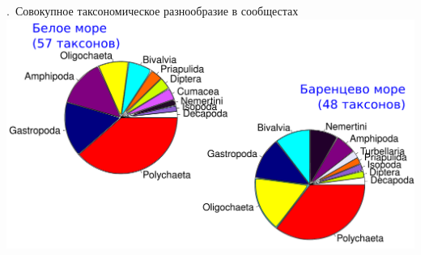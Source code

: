 \documentclass[aspectratio=169, xcolor=table]{beamer}
\begin{document}
\begin{frame}{\insertpagenumber.\ Совокупное таксономическое разнообразие в сообщестах}
			\includegraphics[width=\textwidth]{taxa.pdf}
\end{frame}


\end{document}
